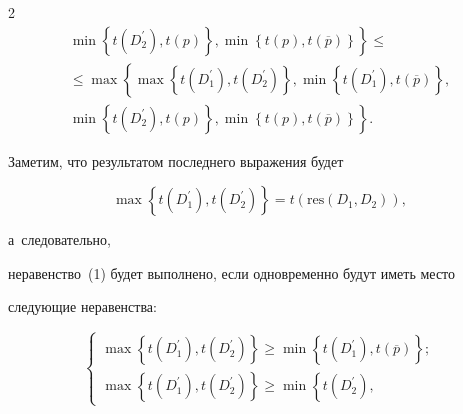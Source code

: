\begin{multicols}{2}
\begin{multline*}
 \left. \min\left\{ t(D_2^\prime), t(p)\right\},


  \min\left\{ t(p), t(\overline{p})\right\}\right\}\leq{}\\[1pt]


  {}\leq


  \max \left\{ \max \left\{ t(D_1^\prime), t(D_2^\prime)\right\}, \min\left\{ 


t(D_1^\prime), t(\overline{p})\right\},\right.\\[1pt]


\left.


  \min\left\{ t(D_2^\prime), t(p)\right\}, \min\left\{ t(p), 


t(\overline{p})\right\}\right\}.


  \end{multline*}


  




  


  Заметим, что результатом последнего выражения будет 


  $$


  \max \left\{ t\left(D_1^\prime\right), t\left(D_2^\prime\right)\right\}= t\left(\mathrm{res}\left( D_1, D_2\right)\right),


  $$


  


  \vspace*{-3pt}


  


  \noindent


   а~следовательно, 


неравенство~(1) будет выполнено, если одновременно будут иметь место 


следующие неравенства:


  \begin{equation*}


  \left\{


  \begin{array}{l}


  \max\left\{ t(D_1^\prime), t(D_2^\prime)\right\} \geq \min \left\{ t(D_1^\prime), 


t(\overline{p})\right\};\\[6pt]


  \max\left\{ t(D_1^\prime), t(D_2^\prime)\right\} \geq \min \left\{ t(D_2^\prime), 



\end{array}
\end{equation*}
\end{multicols}
